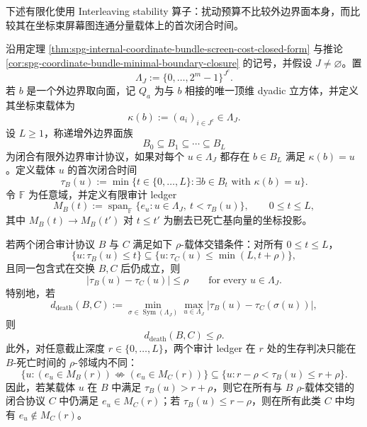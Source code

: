 下述有限化使用 Interleaving stability 算子：扰动预算不比较外边界面本身，而比较其在坐标束屏幕图连通分量载体上的首次闭合时间。
\begin{theorem}[坐标束闭合审计的载体死亡时间稳定定理]\label{distill:persistent_homology_persistence_modules_and_constructible_sheaf_persistence-stability_and_interleaving-spg-coordinate-bundle-carrier-death-stability}
沿用定理 \ref{thm:spg-internal-coordinate-bundle-screen-cost-closed-form} 与推论 \ref{cor:spg-coordinate-bundle-minimal-boundary-closure} 的记号，并假设 \(J\neq\varnothing\)。置
\[
\Lambda_J:=\{0,\dots,2^m-1\}^{J^c}.
\]
若 \(b\) 是一个外边界取向面，记 \(Q_a\) 为与 \(b\) 相接的唯一顶维 dyadic 立方体，并定义其坐标束载体为
\[
\kappa(b):=(a_i)_{i\in J^c}\in \Lambda_J.
\]
设 \(L\ge 1\)，称递增外边界面族
\[
B_0\subseteq B_1\subseteq\cdots\subseteq B_L
\]
为闭合有限外边界审计协议，如果对每个 \(u\in\Lambda_J\) 都存在 \(b\in B_L\) 满足 \(\kappa(b)=u\)。定义载体 \(u\) 的首次闭合时间
\[
\tau_B(u):=\min\{t\in\{0,\dots,L\}:\exists b\in B_t\text{ with }\kappa(b)=u\}.
\]
令 \(\mathbb F\) 为任意域，并定义有限审计 ledger
\[
M_B(t):=\operatorname{span}_{\mathbb F}\{e_u:u\in\Lambda_J,\ t<\tau_B(u)\},\qquad 0\le t\le L,
\]
其中 \(M_B(t)\to M_B(t')\) 对 \(t\le t'\) 为删去已死亡基向量的坐标投影。

若两个闭合审计协议 \(B\) 与 \(C\) 满足如下 \(\rho\)-载体交错条件：对所有 \(0\le t\le L\)，
\[
\{u:\tau_B(u)\le t\}\subseteq \{u:\tau_C(u)\le \min(L,t+\rho)\},
\]
且同一包含式在交换 \(B,C\) 后仍成立，则
\[
|\tau_B(u)-\tau_C(u)|\le \rho
\qquad\text{for every }u\in\Lambda_J.
\]
特别地，若
\[
d_{\mathrm{death}}(B,C):=\min_{\sigma\in\operatorname{Sym}(\Lambda_J)}\max_{u\in\Lambda_J}|\tau_B(u)-\tau_C(\sigma(u))|,
\]
则
\[
d_{\mathrm{death}}(B,C)\le \rho.
\]
此外，对任意截止深度 \(r\in\{0,\dots,L\}\)，两个审计 ledger 在 \(r\) 处的生存判决只能在 \(B\)-死亡时间的 \(\rho\)-邻域内不同：
\[
\{u:(e_u\in M_B(r))\not\Longleftrightarrow(e_u\in M_C(r))\}
\subseteq
\{u:r-\rho<\tau_B(u)\le r+\rho\}.
\]
因此，若某载体 \(u\) 在 \(B\) 中满足 \(\tau_B(u)>r+\rho\)，则它在所有与 \(B\) \(\rho\)-载体交错的闭合协议 \(C\) 中仍满足 \(e_u\in M_C(r)\)；若 \(\tau_B(u)\le r-\rho\)，则在所有此类 \(C\) 中均有 \(e_u\notin M_C(r)\)。
\end{theorem}

